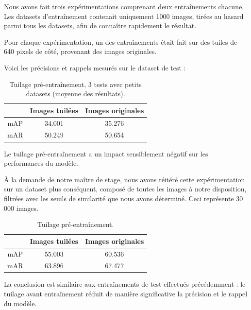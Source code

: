 Nous avons fait trois expérimentations comprenant deux entraînements chacune.
Les datasets d'entraînement contenait uniquement 1000 images, tirées au hasard parmi tous les datasets,
afin de connaître rapidement le résultat.

Pour chaque expérimentation, un des entraînements était fait sur des tuiles de 640 pixels de côté,
provenant des images originales.

Voici les précisions et rappels mesurés sur le dataset de test :\\

\begin{table}[h]
    \begin{center}
        \begin{tabular}{c c c}
            \hline
            & Images tuilées & Images originales \\
            \hline
            mAP & 34.001 & 35.276 \\
            mAR & 50.249 & 50.654 \\
        \end{tabular}
    \end{center}
    \caption{Tuilage pré-entraînement, 3 tests avec petits datasets (moyenne des résultats).}
\end{table}

Le tuilage pré-entraînement a un impact sensiblement négatif sur les performances du modèle.

À la demande de notre maître de stage, nous avons réitéré cette expérimentation sur un
dataset plus conséquent, composé de toutes les images à notre disposition, filtrées
avec les seuils de similarité que nous avons déterminé. Ceci représente
30 000 images.

\begin{table}[h]
    \begin{center}
        \begin{tabular}{c c c}
            \hline
            & Images tuilées & Images originales \\
            \hline
            mAP & 55.003 & 60.536 \\
            mAR & 63.896 & 67.477 \\
        \end{tabular}
    \end{center}
    \caption{Tuilage pré-entraînement.}
\end{table}

La conclusion est similaire aux entraînements de test effectués précédemment :
le tuilage avant entraînement réduit de manière significative la précision et
le rappel du modèle.


